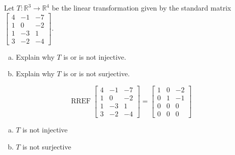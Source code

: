 
\begin{exerciseStatement}
 Let \(T:\mathbb{R}^ 3  \to \mathbb{R}^ 4 \) be the linear transformation given by the standard matrix \( \left[\begin{array}{ccc}
4 & -1 & -7 \\
1 & 0 & -2 \\
1 & -3 & 1 \\
3 & -2 & -4
\end{array}\right] .\)
\begin{enumerate}[(a)]
\item Explain why \(T\) is or is not injective.
\item Explain why \(T\) is or is not surjective.
\end{enumerate}
    
\end{exerciseStatement}
    
\begin{exerciseAnswer} 


\[\operatorname{RREF} \left[\begin{array}{ccc}
4 & -1 & -7 \\
1 & 0 & -2 \\
1 & -3 & 1 \\
3 & -2 & -4
\end{array}\right] = \left[\begin{array}{ccc}
1 & 0 & -2 \\
0 & 1 & -1 \\
0 & 0 & 0 \\
0 & 0 & 0
\end{array}\right] \]


\begin{enumerate}[(a)]
\item \(T\) is not injective
\item \(T\) is not surjective
\end{enumerate}
    
\end{exerciseAnswer}
    
